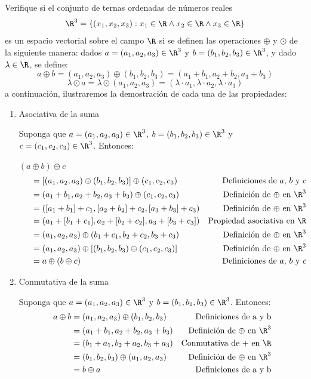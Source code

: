 \documentclass[compacto,10pt]{pubciencias-notas}
\begin{document}
\begin{ejem}\hspace{0pt} Verifique si el conjunto de ternas ordenadas de números reales
\[\R^{3} =\{(x_1, x_2, x_3) : x_1\in \R \wedge x_2\in \R \wedge x_3\in \R\}\]
es un espacio vectorial sobre el campo $\R$ si se definen las operaciones $\oplus$ y $\odot$ de la siguiente manera: dados $a=(a_1,a_2,a_3)\in \R^{3}$ y $b=(b_1,b_2,b_3)\in \R^{3}$, y dado $\lambda\in \R$, se define:
\[a\oplus b = (a_1, a_2, a_3) \oplus (b_1, b_2, b_3) = (a_1+b_1, a_2+b_2, a_3+b_3)\]
\[\lambda \odot a = \lambda \odot (a_1,a_2,a_3) = (\lambda\cdot a_1, \lambda\cdot a_2, \lambda\cdot a_3)\]
a continuación, ilustraremos la demostración de cada una de las propiedades:

\begin{enumerate}
\item Asociativa de la suma
    
Suponga que $a=(a_1,a_2,a_3)\in \R^{3}$, $b=(b_1,b_2,b_3)\in \R^{3}$ y $c=(c_1,c_2,c_3)\in \R^{3}$. Entonces:
    
$(a \oplus b) \oplus c$
\begin{align*}
    \phantom{abc}&= [(a_1,a_2,a_3) \oplus (b_1,b_2,b_3)] \oplus (c_1,c_2,c_3) & \text{Definiciones de $a$, $b$ y $c$}\\
    &= (a_1+b_1, a_2+b_2, a_3+b_3) \oplus (c_1,c_2,c_3) & \text{Definición de $\oplus$ en $\R^{3}$}\\
    &= ([a_1+b_1]+c_1, [a_2+b_2]+c_2, [a_3+b_3]+c_3) & \text{Definición de $\oplus$ en $\R^{3}$}\\
    &= (a_1+[b_1+c_1], a_2+[b_2+c_2], a_3+[b_3+c_3]) & \text{Propiedad asociativa en $\R$}\\
    &= (a_1,a_2,a_3) \oplus (b_1+c_1, b_2+c_2, b_3+c_3) & \text{Definición de $\oplus$ en $\R^{3}$}\\
    &= (a_1,a_2,a_3) \oplus [(b_1,b_2,b_3) \oplus (c_1,c_2,c_3)] & \text{Definición de $\oplus$ en $\R^{3}$}\\
    &= a\oplus (b\oplus c) & \text{Definiciones de $a$, $b$ y $c$}
\end{align*}
    
\item Conmutativa de la suma
    
Suponga que $a=(a_1,a_2,a_3)\in \R^{3}$ y $b=(b_1,b_2,b_3)\in \R^{3}$. Entonces:
\begin{align*}
    a \oplus b &= (a_1, a_2, a_3) \oplus (b_1, b_2, b_3) & \text{Definiciones de a y b}\\
    &= (a_1+b_1, a_2+b_2, a_3+b_3) & \text{Definición de $\oplus$ en $\R^{3}$}\\
    &= (b_1+a_1, b_2+a_2, b_3+a_3) & \text{Conmutativa de $+$ en $\R$}\\
    &= (b_1, b_2, b_3) \oplus (a_1, a_2, a_3) & \text{Definición de $\oplus$ en $\R^{3}$}\\
    &= b\oplus a & \text{Definiciones de a y b}
\end{align*}
    

\end{enumerate}
\end{ejem}
\end{document}

